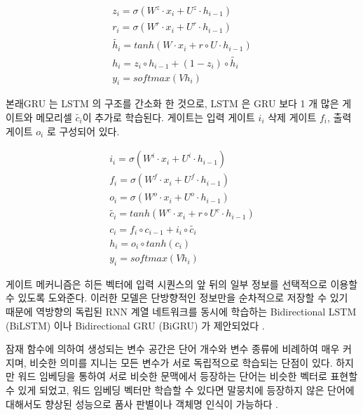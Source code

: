 \documentclass[oneside, ko,phd]{snuthesis_utf8_kor}
\begin{document}
\begin{equation}
  \label{eq:gru}
  \begin{aligned}
  z_i = \sigma(W^z \cdot x_i + U^z \cdot h_{i-1}) \\
  r_i = \sigma(W^r \cdot x_i + U^r \cdot h_{i-1}) \\
  \tilde{h_i} = tanh \left( W \cdot x_i + r \circ U \cdot h_{i-1}\right) \\
  h_i = z_i \circ h_{i-1} + (1 - z_i) \circ \tilde{h_i} \\
  y_i = softmax(Vh_i)
  \end{aligned}
\end{equation}

본래GRU 는 LSTM 의 구조를 간소화 한 것으로, LSTM 은 GRU 보다 1 개 많은 게이트와 메모리셀 $\tilde{c_i}$이 추가로 학습된다.
게이트는 입력 게이트 $i_i$ 삭제 게이트 $f_i$, 출력 게이트 $o_i$ 로 구성되어 있다.

\begin{equation}
  \label{eq:lstm}
  \begin{aligned}
  i_i = \sigma(W^i \cdot x_i + U^i \cdot h_{i-1}) \\
  f_i = \sigma(W^f \cdot x_i + U^f \cdot h_{i-1}) \\
  o_i = \sigma(W^o \cdot x_i + U^o \cdot h_{i-1}) \\
  \tilde{c_i} = tanh \left( W^c \cdot x_i + r \circ U^c \cdot h_{i-1}\right) \\
  c_i = f_i \circ c_{i-1} + i_i \circ \tilde{c_i} \\
  h_i = o_i \circ tanh (c_i) \\
  y_i = softmax(Vh_i)
  \end{aligned}
\end{equation}

게이트 메커니즘은 히든 벡터에 입력 시퀀스의 앞 뒤의 일부 정보를 선택적으로 이용할 수 있도록 도와준다.
이러한 모델은 단방향적인 정보만을 순차적으로 저장할 수 있기 때문에 역방향의 독립된 RNN 계열 네트워크를 동시에 학습하는 Bidirectional LSTM (BiLSTM) 이나 Bidirectional GRU (BiGRU) 가 제안되었다 \cite{graves2005bidirectional}.

잠재 함수에 의하여 생성되는 변수 공간은 단어 개수와 변수 종류에 비례하여 매우 커지며, 비슷한 의미를 지니는 모든 변수가 서로 독립적으로 학습되는 단점이 있다.
하지만 워드 임베딩을 통하여 서로 비슷한 문맥에서 등장하는 단어는 비슷한 벡터로 표현할 수 있게 되었고, 워드 임베딩 벡터만 학습할 수 있다면 말뭉치에 등장하지 않은 단어에 대해서도 향상된 성능으로 품사 판별이나 객체명 인식이 가능하다 \cite{collobert2011natural, lample2016neural}.
\end{document}
